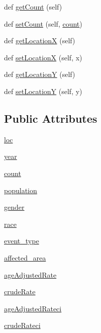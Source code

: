 \begin{DoxyCompactItemize}
\item 
def \hyperlink{class_cancer_incidence_1_1_cancer_incidence_a6ccdad0af30eead93ffe3e249310ae49}{get\+Count} (self)
\item 
def \hyperlink{class_cancer_incidence_1_1_cancer_incidence_a425ab75f9d216721d767fad7af0fc196}{set\+Count} (self, \hyperlink{class_cancer_incidence_1_1_cancer_incidence_a7627584cd6a537797741c291833ca0c6}{count})
\item 
def \hyperlink{class_cancer_incidence_1_1_cancer_incidence_a2ce5e8362ab8d0948230775cca9161b2}{get\+Location\+X} (self)
\item 
def \hyperlink{class_cancer_incidence_1_1_cancer_incidence_a8cfea368d1cda9b94fcac03f116dfe4e}{set\+Location\+X} (self, x)
\item 
def \hyperlink{class_cancer_incidence_1_1_cancer_incidence_a3e5fe2583e2eafd1c7543114f68f3dcb}{get\+Location\+Y} (self)
\item 
def \hyperlink{class_cancer_incidence_1_1_cancer_incidence_ad8585a3252d4cbf30959daa47d731179}{set\+Location\+Y} (self, y)
\end{DoxyCompactItemize}
\subsection*{Public Attributes}
\begin{DoxyCompactItemize}
\item 
\hyperlink{class_cancer_incidence_1_1_cancer_incidence_aab4355a92c91c9adde2f38e62c8f499d}{loc}
\item 
\hyperlink{class_cancer_incidence_1_1_cancer_incidence_ad3ebc04a77307ff150f2d6f0f95b3de7}{year}
\item 
\hyperlink{class_cancer_incidence_1_1_cancer_incidence_a7627584cd6a537797741c291833ca0c6}{count}
\item 
\hyperlink{class_cancer_incidence_1_1_cancer_incidence_ac89ae8d4a5a136f71dc339d4af256904}{population}
\item 
\hyperlink{class_cancer_incidence_1_1_cancer_incidence_ad8f6e9c194bed1ced8a6ce0f8e1678f0}{gender}
\item 
\hyperlink{class_cancer_incidence_1_1_cancer_incidence_aabf2d41cf0000d41fb135b2801b35334}{race}
\item 
\hyperlink{class_cancer_incidence_1_1_cancer_incidence_a84cfbb0f8518f5b63ab09d61cf020984}{event\+\_\+type}
\item 
\hyperlink{class_cancer_incidence_1_1_cancer_incidence_aed83029c9ab4fdda4ecea2c4eda29c63}{affected\+\_\+area}
\item 
\hyperlink{class_cancer_incidence_1_1_cancer_incidence_ac799c09cc336e00b0723fe9d0ecde5ab}{age\+Adjusted\+Rate}
\item 
\hyperlink{class_cancer_incidence_1_1_cancer_incidence_a55e91b4b3cf8fce6fd37a7c0e5ca1a52}{crude\+Rate}
\item 
\hyperlink{class_cancer_incidence_1_1_cancer_incidence_af7848cd32d6e2c45bdd12500aed2c4f3}{age\+Adjusted\+Rateci}
\item 
\hyperlink{class_cancer_incidence_1_1_cancer_incidence_aece0ef64d99a5dbbb4b9ac4592e8fddc}{crude\+Rateci}
\end{DoxyCompactItemize}


